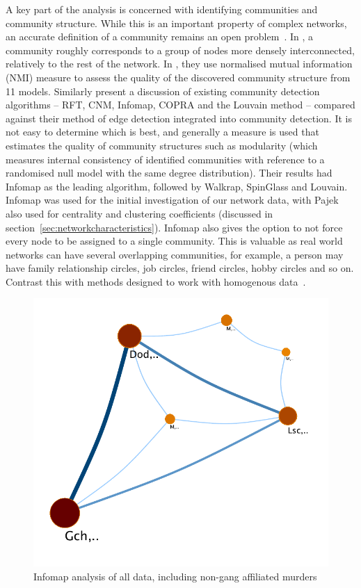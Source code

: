 \documentclass[twocolumn]{svjour3}          %
\theoremstyle{definition}
\begin{document}
A key part of the analysis is concerned with identifying communities
and community structure. While this is an important property of
complex networks, an accurate definition of a community remains an
open problem~\citep{liu-et-al:2014}. In \citet{orman-et-al:2011}, a
community roughly corresponds to a group of nodes more densely
interconnected, relatively to the rest of the network. In
\citet{orman-et-al:2011b}, they use normalised mutual information
(NMI) measure to assess the quality of the discovered community
structure from 11 models. Similarly \citet{yan+gregory:2012} present a
discussion of existing community detection algorithms -- RFT, CNM,
Infomap, COPRA and the Louvain method -- compared against their method
of edge detection integrated into community detection. It is not easy
to determine which is best, and generally a measure is used that
estimates the quality of community structures such as modularity
(which measures internal consistency of identified communities with
reference to a randomised null model with the same degree
distribution). Their results had Infomap as the leading algorithm,
followed by Walkrap, SpinGlass and Louvain. Infomap was used for the
initial investigation of our network data, with Pajek also used for
centrality and clustering coefficients (discussed in
section~\ref{sec:networkcharacteristics}). Infomap also gives the
option to not force every node to be assigned to a single
community. This is valuable as real world networks can have several
overlapping communities, for example, a person may have family
relationship circles, job circles, friend circles, hobby circles and
so on. Contrast this with methods designed to work with homogenous
data~\citep{ferrara-et-al:2014}.

\begin{figure}[!ht]
\centering
\includegraphics[width=\columnwidth]{images/alldataplusmurderers}
\caption{Infomap analysis of all data, including non-gang affiliated murders}
\label{fig:infomap} 
\end{figure}
\end{document}
